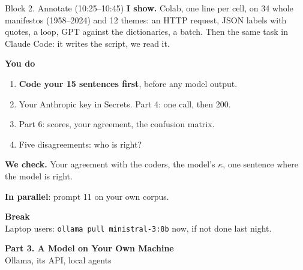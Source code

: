 \documentclass[svgnames,x11names,dvipsnames]{beamer}
\newcommand{\chg}[1]{{\bfseries #1}}
\renewcommand{\chg}[1]{#1}
\newcommand{\sectionslide}[2]{%
\begin{frame}[plain]
  \centering
  \vfill
  {\LARGE \textbf{\textcolor{titleblue}{#1}}}\\[0.4cm]
  {#2}
  \vfill
\end{frame}}
\begin{document}
\begin{frame}{Block 2. Annotate \chg{(10:25--10:45)}}
\small
\textbf{I show.} \chg{Colab, one line per cell, on 34 whole manifestos (1958--2024) and 12 themes: an HTTP request, JSON labels with quotes, a loop, GPT against the dictionaries, a batch. Then the same task in Claude Code: it writes the script, we read it.}

\vspace{0.4cm}
\textbf{You do}
\begin{enumerate}
    \setlength{\itemsep}{4pt}
    \item \textbf{Code your 15 sentences first}, before any model output.
    \item Your Anthropic key in Secrets. Part 4: one call, then 200.
    \item Part 6: scores, your agreement, the confusion matrix.
    \item Five disagreements: who is right?
\end{enumerate}

\vspace{0.4cm}
\textbf{We check.} Your agreement with the coders, the model's $\kappa$, one sentence where the model is right.

\vspace{0.4cm}
\textbf{In parallel}: prompt 11 on your own corpus.
\end{frame}

\begin{frame}[plain]
  \centering
  \vfill
  {\LARGE \textbf{\textcolor{titleblue}{Break}}}\\[0.6cm]
  {\small Laptop users: \texttt{ollama pull ministral-3:8b} now, if not done last night.}
  \vfill
\end{frame}

\sectionslide{Part 3. A Model on Your Own Machine}{\chg{Ollama, its API, local agents}}
\end{document}
